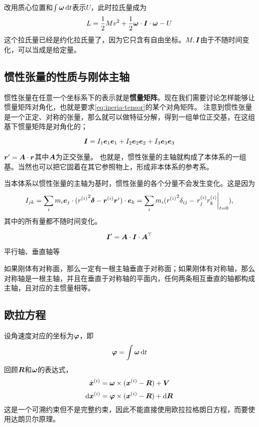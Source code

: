 \documentclass[UTF8, a4paper]{ctexart}
\renewcommand*{\dd}{\mathop{}\!\mathrm{d}}
\DeclareMathOperator{\timeorder}{T}
\begin{document}
改用质心位置和$\int \vb*{\omega} \dd t$表示$U$，此时拉氏量成为
\begin{equation}
    L = \frac{1}{2} M v^2 + \frac{1}{2} \vb*{\omega} \cdot \vb*{I} \cdot \vb*{\omega} - U
    \label{eq:rigid-body-lagrangian}
\end{equation}
这个拉氏量已经是约化拉氏量了，因为它只含有自由坐标。$M, \vb*{I}$由于不随时间变化，可以当成是给定量。

\subsection{惯性张量的性质与刚体主轴}

惯性张量在任意一个坐标系下的表示就是\textbf{惯量矩阵}。现在我们需要讨论怎样能够让惯量矩阵对角化，也就是要求\eqref{eq:ineria-tensor}的某个对角矩阵。
注意到惯性张量是一个正定、对称的张量，那么就可以做特征分解，得到一组单位正交基，在这组基下惯量矩阵是对角化的；

\begin{equation}
    \vb*{I} = I_1 \vb*{e}_1 \vb*{e}_1 + I_2 \vb*{e}_2 \vb*{e}_2 + I_3 \vb*{e}_3 \vb*{e}_3
\end{equation}

$\vb*{r}' = \vb*{A} \cdot \vb*{r}$其中$\vb*{A}$为正交张量。
也就是，惯性张量的主轴就构成了本体系的一组基。当然也可以把它固着在其它参照物上，形成非本体系的参考系。

当本体系以惯性张量的主轴为基时，惯性张量的各个分量不会发生变化。这是因为
\[
    I_{jk} = \sum_i m_i \vb*{e}_j \cdot ({r^{(i)}}^2 \vb*{\delta} - \vb*{r}^{(i)}\vb*{r}^{i}) \cdot \vb*{e}_k = \sum_i m_i ({r^{(i)}}^2 \delta_{ij} - \eval{r^{(i)}_j r^{(i)}_k}_{t=0}),
\]
其中的所有量都不随时间变化。

\begin{equation}
    \vb*{I}' = \vb*{A} \cdot \vb*{I} \cdot \vb*{A}^\top
\end{equation}

平行轴、垂直轴等

如果刚体有对称面，那么一定有一根主轴垂直于对称面；如果刚体有对称轴，那么对称轴是一根主轴，并且在垂直于对称轴的平面内，任何两条相互垂直的轴都构成主轴，且对应的主惯量相等。

\subsection{欧拉方程}

设角速度对应的坐标为$\vb*{\varphi}$，即
\[
    \vb*{\varphi} = \int \vb*{\omega} \dd t
\]
回顾$\vb*{R}$和$\vb*{\omega}$的表达式，
\[
    \dot{\vb*{x}}^{(i)} = \vb*{\omega} \times (\vb*{x}^{(i)} - \vb*{R}) + \vb*{V}
\]
\[
    \dd{\vb*{x}^{(i)}} = \vb*{\varphi} \times (\vb*{x}^{(i)} - \vb*{R}) + \dd{\vb*{R}}
\]
这是一个可溯约束但不是完整约束，因此不能直接使用欧拉拉格朗日方程，而要使用达朗贝尔原理。
\end{document}
